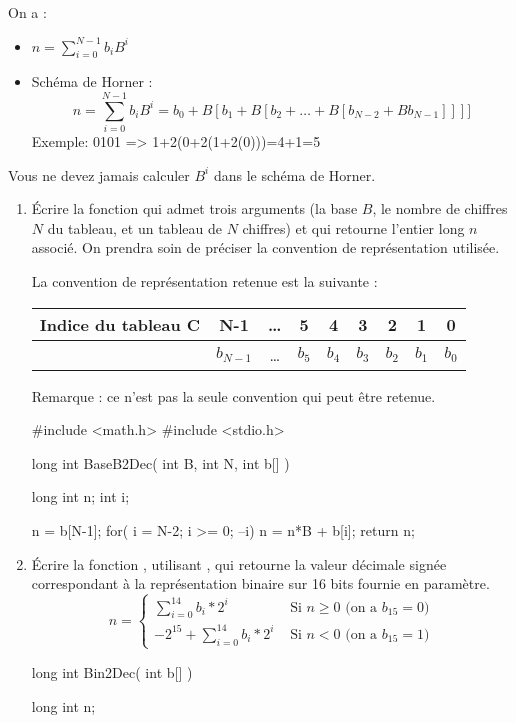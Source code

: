 On a :
\begin{itemize}
  \item $n=\sum_{i=0}^{N-1}b_iB^i$
  \item Schéma de Horner : $$n=\sum\limits_{i=0}^{N-1}b_iB^i=b_0+B[b_1+B[b_2+\ldots+B[b_{N-2}+Bb_{N-1}]]]]$$
  Exemple: 0101 => 1+2(0+2(1+2(0)))=4+1=5
\end{itemize}

\begin{warning}
\noindent Vous ne devez jamais calculer $B^i$ dans le schéma de Horner.
\end{warning}

\begin{enumerate}
  \item Écrire la fonction  qui admet trois arguments (la base $B$, le nombre de chiffres $N$ du tableau, et un tableau de $N$ chiffres) et qui retourne l'entier long $n$ associé. On prendra soin de préciser la convention de représentation utilisée.

\begin{correction}
La convention de représentation retenue est la suivante :
\begin{center}
\begin{tabular}{|l|c|c|c|c|c|c|c|c|}
\hline
Indice du tableau C&N-1&\ldots&5&4&3&2&1&0\\
\hline
               &$b_{N-1}$&\ldots&$b_5$&$b_4$&$b_3$&$b_2$&$b_1$&$b_0$\\
\hline
\end{tabular}
\end{center}
Remarque : ce n'est pas la seule convention qui peut être retenue.
\end{correction}
\begin{csourcecorrection}
#include <math.h>
#include <stdio.h>

long int BaseB2Dec( int B, int N, int b[] )
{
  long int n;
  int i;

  n = b[N-1];
  for( i = N-2; i >= 0; --i)
    n = n*B + b[i];
  return n;
}
\end{csourcecorrection}
  \item Écrire la fonction , utilisant , qui retourne la valeur décimale signée correspondant à la représentation binaire sur 16 bits fournie en paramètre.
  \begin{equation}
n=\left\{\begin{array}{ll}
      \sum\limits_{i=0}^{14}b_i*2^i&\mbox{ Si $n\geq 0$ (on a $b_{15}=0$)}\\
      -2^{15}+\sum\limits_{i=0}^{14}b_i*2^i&\mbox{ Si $n<0$ (on a $b_{15}=1$)}
      \end{array}\right.
  \label{dec2bin}
\end{equation}
\begin{csourcecorrection}
long int Bin2Dec( int b[] )
{
  long int n;

}
\end{csourcecorrection}
\end{enumerate}
